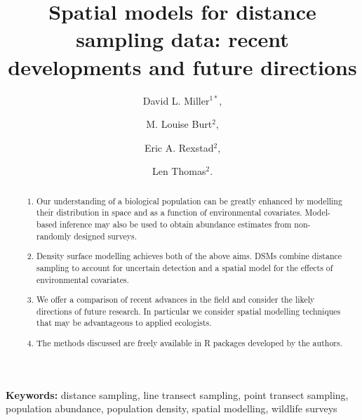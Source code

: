 \documentclass[a4paper,12pt]{article}
\title{Spatial models for distance sampling data: recent developments and future directions}
\author{
David L. Miller$^{1*}$, \and
M. Louise Burt$^{2}$, \and
Eric A. Rexstad$^{2}$, \and 
Len Thomas$^{2}$.}
\begin{document}
\maketitle

\begin{abstract}
  \noindent 
  

\begin{enumerate}
	\item Our understanding of a biological population can be greatly enhanced by modelling their distribution in space and as a function of environmental covariates. Model-based inference may also be used to obtain abundance estimates from non-randomly designed surveys. 
	\item Density surface modelling achieves both of the above aims. DSMs combine distance sampling to account for uncertain detection and a spatial model for the effects of environmental covariates.
	\item We offer a comparison of recent advances in the field and consider the likely directions of future research. In particular we consider spatial modelling techniques that may be advantageous to applied ecologists.
	\item The methods discussed are freely available in \textsf{R} packages developed by the authors.
\end{enumerate}
 

\end{abstract}

\noindent \textbf{Keywords:} distance sampling, line transect sampling, point transect sampling, population abundance, population density, spatial modelling, wildlife surveys
\end{document}
